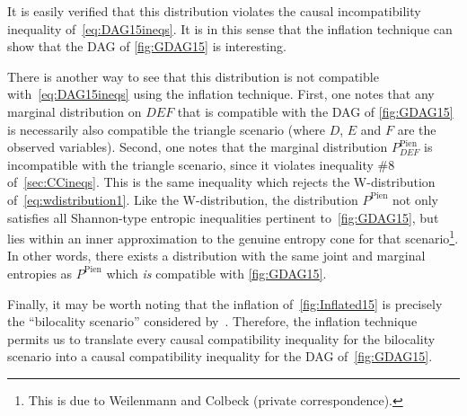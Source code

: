 {It is easily verified that this distribution violates the causal incompatibility inequality of~\cref{eq:DAG15ineqs}.  It is in this sense that the inflation technique can show that the DAG of \cref{fig:GDAG15} is interesting. 

There is another way to see that this distribution is not compatible with~\cref{eq:DAG15ineqs} using the inflation technique.  First, one notes that any marginal distribution on $DEF$ that is compatible with the DAG of \cref{fig:GDAG15} is necessarily also compatible the triangle scenario (where $D$, $E$ and $F$ are the observed variables).
Second, one notes that the marginal distribution $P^{\text{Pien}}_{D E F}$ is incompatible with the triangle scenario, since it violates inequality \#8 of~\cref{sec:CCineqs}.  This is the same inequality which rejects the W-distribution of~\cref{eq:wdistribution1}.
Like the W-distribution, the distribution $P^{\text{Pien}}$
 not only satisfies all Shannon-type entropic inequalities pertinent to~\cref{fig:GDAG15}, but lies within an inner approximation to the genuine entropy cone for that scenario\footnote{This is due to Weilenmann and Colbeck (private correspondence).}. In other words, there exists a distribution with the same joint and marginal entropies as  $P^{\text{Pien}}$ which \emph{is} compatible with \cref{fig:GDAG15}.

Finally, it may be worth noting that the inflation of~\cref{fig:Inflated15} is precisely the ``bilocality scenario'' considered by~\citet{BilocalCorrelations}.  Therefore, the inflation technique permits us to translate every causal compatibility inequality for the bilocality scenario into a causal compatibility inequality for the DAG of~\cref{fig:GDAG15}.




}
